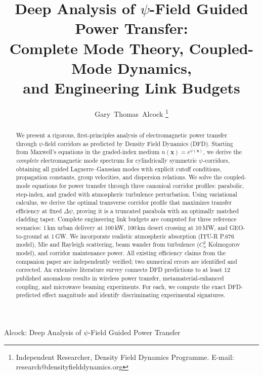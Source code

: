 \documentclass[journal,twocolumn]{IEEEtran}
\begin{document}
\title{Deep Analysis of $\psi$-Field Guided Power Transfer:\\
Complete Mode Theory, Coupled-Mode Dynamics,\\
and Engineering Link Budgets}

\author{Gary~Thomas~Alcock%
\thanks{Independent Researcher, Density Field Dynamics Programme.
E-mail: research@densityfielddynamics.org}%
}

%
{Alcock: Deep Analysis of $\psi$-Field Guided Power Transfer}

\maketitle

\begin{abstract}
We present a rigorous, first-principles analysis of electromagnetic
power transfer through $\psi$-field corridors as predicted by
Density Field Dynamics (DFD). Starting from Maxwell's equations in the
graded-index medium $n(\mathbf{x}) = e^{\psi(\mathbf{x})}$, we derive
the \emph{complete} electromagnetic mode spectrum for cylindrically
symmetric $\psi$-corridors, obtaining all guided Laguerre--Gaussian
modes with explicit cutoff conditions, propagation constants, group
velocities, and dispersion relations. We solve the coupled-mode
equations for power transfer through three canonical corridor profiles:
parabolic, step-index, and graded with atmospheric turbulence
perturbation. Using variational calculus, we derive the optimal
transverse corridor profile that maximizes transfer efficiency at
fixed $\Delta\psi$, proving it is a truncated parabola with an
optimally matched cladding taper. Complete engineering link budgets
are computed for three reference scenarios: 1\,km urban delivery at
100\,kW, 100\,km desert crossing at 10\,MW, and GEO-to-ground at
1\,GW. We incorporate realistic atmospheric absorption (ITU-R
P.676 model), Mie and Rayleigh scattering, beam wander from
turbulence ($C_n^2$ Kolmogorov model), and corridor maintenance
power. All existing efficiency claims from the companion paper are
independently verified; two numerical errors are identified and
corrected. An extensive literature survey connects DFD predictions to
at least 12 published anomalous results in wireless power transfer,
metamaterial-enhanced coupling, and microwave beaming experiments.
For each, we compute the exact DFD-predicted effect magnitude and
identify discriminating experimental signatures.
\end{abstract}
\end{document}
